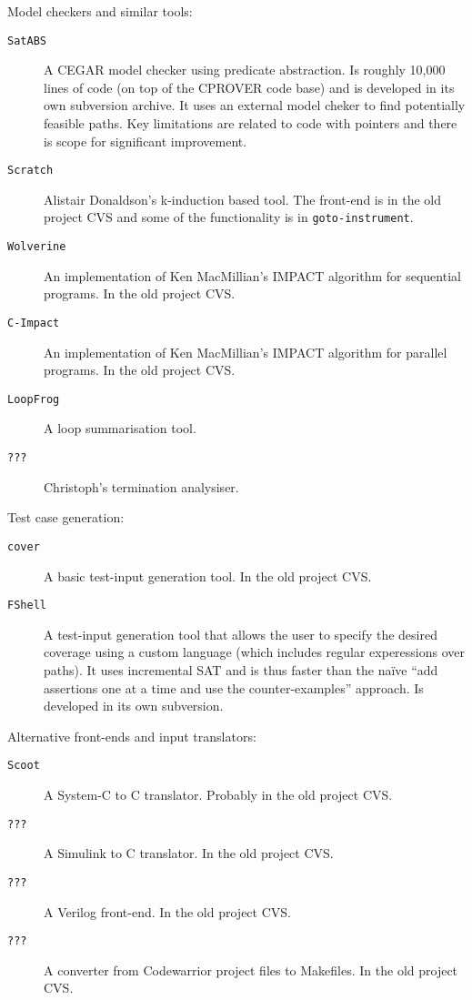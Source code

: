 \documentclass{article}
\newcommand{\prog}[1]{\texttt{#1}}
\begin{document}
Model checkers and similar tools:

\begin{description}
  \item[\prog{SatABS}]{A CEGAR model checker using predicate
    abstraction.  Is roughly 10,000 lines of code (on top of the CPROVER
    code base) and is developed in its own subversion archive.  It
    uses an external model cheker to find potentially feasible paths.
    Key limitations are related to code with pointers and there is
    scope for significant improvement.}

  \item[\prog{Scratch}]{Alistair Donaldson's k-induction based tool.
    The front-end is in the old project CVS and some of the
    functionality is in \prog{goto-instrument}.}

  \item[\prog{Wolverine}]{An implementation of Ken MacMillian's IMPACT
    algorithm for sequential programs.  In the old project CVS.}

  \item[\prog{C-Impact}]{An implementation of Ken MacMillian's IMPACT
    algorithm for parallel programs.  In the old project CVS.}

  \item[\prog{LoopFrog}]{A loop summarisation tool.}

  \item[\prog{???}]{Christoph's termination analysiser.}

\end{description}


Test case generation:

\begin{description}
  \item[\prog{cover}]{A basic test-input generation tool.  In the old
    project CVS.}

  \item[\prog{FShell}]{A test-input generation tool that allows the
      user to specify the desired coverage using a custom language
      (which includes regular experessions over paths).  It uses
      incremental SAT and is thus faster than the na\"ive ``add
      assertions one at a time and use the counter-examples''
      approach.  Is developed in its own subversion.}
\end{description}



Alternative front-ends and input translators:

\begin{description}
  \item[\prog{Scoot}]{A System-C to C translator.  Probably in the old
    project CVS.}
  
  \item[\prog{???}]{A Simulink to C translator.  In the old project CVS.}

  \item[\prog{???}]{A Verilog front-end.  In the old project CVS.}

  \item[\prog{???}]{A converter from Codewarrior project files to
    Makefiles.  In the old project CVS.}
\end{description}
\end{document}
